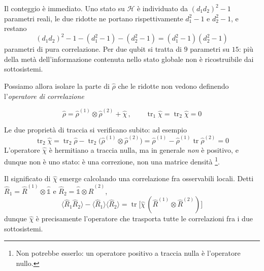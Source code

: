 Il conteggio è immediato. Uno stato su $\mathcal{H}$ è individuato da
$(d_1 d_2)^2 - 1$ parametri reali, le due ridotte ne portano
rispettivamente $d_1^2 - 1$ e $d_2^2 - 1$, e restano
%
\begin{equation}
    (d_1 d_2)^2 - 1 - (d_1^2 - 1) - (d_2^2 - 1)
    = (d_1^2 - 1)(d_2^2 - 1)
    \label{eq:conteggio-correlazioni}
\end{equation}
%
parametri di pura correlazione. Per due qubit si tratta di $9$ parametri
su $15$: più della metà dell'informazione contenuta nello stato globale
non è ricostruibile dai sottosistemi.

Possiamo allora isolare la parte di $\hat{\rho}$ che le ridotte non
vedono definendo l'\emph{operatore di correlazione}%
%
\begin{tcolorbox}[colback=black!5!white, colframe=black!45!white, boxrule=0.8pt]
\begin{equation}
    \hat{\rho} = \hat{\rho}^{(1)} \otimes \hat{\rho}^{(2)} + \hat{\chi}
    \, , \qquad
    \operatorname{tr}_1 \hat{\chi} = \operatorname{tr}_2 \hat{\chi} = 0
    \label{eq:decomposizione-correlazione}
\end{equation}
\end{tcolorbox}
%
Le due proprietà di traccia si verificano subito: ad esempio
%
\begin{equation*}
    \operatorname{tr}_2 \hat{\chi} = \operatorname{tr}_2 \hat{\rho}
    - \operatorname{tr}_2 \bigl( \hat{\rho}^{(1)} \otimes
    \hat{\rho}^{(2)} \bigr)
    = \hat{\rho}^{(1)} - \hat{\rho}^{(1)}
    \operatorname{tr} \hat{\rho}^{(2)} = 0
\end{equation*}
%
L'operatore $\hat{\chi}$ è hermitiano a traccia nulla, ma in generale
\emph{non} è positivo, e dunque non è uno stato: è una correzione, non
una matrice densità%
\footnote{Non potrebbe esserlo: un operatore positivo a traccia nulla è
l'operatore nullo.}.

Il significato di $\hat{\chi}$ emerge calcolando una correlazione fra
osservabili locali. Detti $\hat{R}_1 = \hat{R}^{(1)} \otimes
\hat{\mathbb{1}}$ e $\hat{R}_2 = \hat{\mathbb{1}} \otimes \hat{R}^{(2)}$,
%
\begin{equation}
    \bigl\langle \hat{R}_1 \hat{R}_2 \bigr\rangle
    - \bigl\langle \hat{R}_1 \bigr\rangle
      \bigl\langle \hat{R}_2 \bigr\rangle
    = \operatorname{tr} \bigl[ \hat{\chi} \,
      ( \hat{R}^{(1)} \otimes \hat{R}^{(2)} ) \bigr]
    \label{eq:correlazione-chi}
\end{equation}
%
dunque $\hat{\chi}$ è precisamente l'operatore che trasporta tutte le
correlazioni fra i due sottosistemi.

